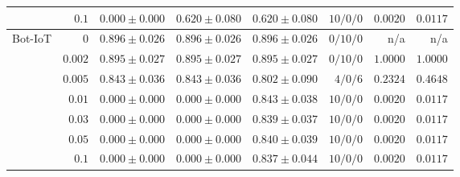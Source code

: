\begin{table}[t]
\begin{tabular}{@{}lrrrrrrr@{}}
 & $0.1$ & $0.000 \pm 0.000$ & $0.620 \pm 0.080$ & $0.620 \pm 0.080$ & $10/0/0$ & $0.0020$ & $0.0117$ \\
\midrule
\multirow{7}{*}{Bot-IoT}
 & $0$ & $0.896 \pm 0.026$ & $0.896 \pm 0.026$ & $0.896 \pm 0.026$ & $0/10/0$ & n/a & n/a \\
 & $0.002$ & $0.895 \pm 0.027$ & $0.895 \pm 0.027$ & $0.895 \pm 0.027$ & $0/10/0$ & $1.0000$ & $1.0000$ \\
 & $0.005$ & $0.843 \pm 0.036$ & $0.843 \pm 0.036$ & $0.802 \pm 0.090$ & $4/0/6$ & $0.2324$ & $0.4648$ \\
 & $0.01$ & $0.000 \pm 0.000$ & $0.000 \pm 0.000$ & $0.843 \pm 0.038$ & $10/0/0$ & $0.0020$ & $0.0117$ \\
 & $0.03$ & $0.000 \pm 0.000$ & $0.000 \pm 0.000$ & $0.839 \pm 0.037$ & $10/0/0$ & $0.0020$ & $0.0117$ \\
 & $0.05$ & $0.000 \pm 0.000$ & $0.000 \pm 0.000$ & $0.840 \pm 0.039$ & $10/0/0$ & $0.0020$ & $0.0117$ \\
 & $0.1$ & $0.000 \pm 0.000$ & $0.000 \pm 0.000$ & $0.837 \pm 0.044$ & $10/0/0$ & $0.0020$ & $0.0117$ \\
\bottomrule
\end{tabular}
\end{table}
